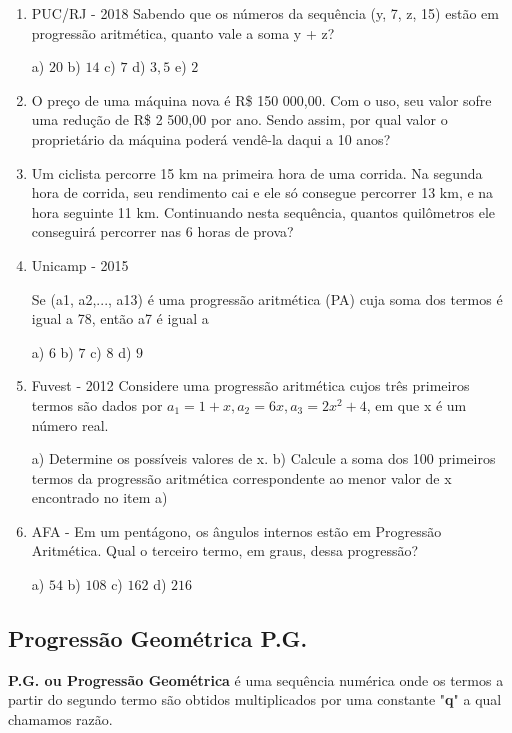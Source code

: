 \begin{multicols*}{2}
	\begin{enumerate}

		\item PUC/RJ - 2018 Sabendo que os números da sequência (y, 7, z, 15) estão em progressão aritmética, quanto vale a soma y + z?

		      a) $20 $ b) $14 $ c) $7 $ d) $3,5 $ e) $2 $

		\item O preço de uma máquina nova é R\$ 150 000,00. Com o uso, seu valor sofre uma redução de R\$ 2 500,00 por ano. Sendo assim, por qual valor o proprietário da máquina poderá vendê-la daqui a 10 anos?

		\item Um ciclista percorre 15 km na primeira hora de uma corrida. Na segunda hora de corrida, seu rendimento cai e ele só consegue percorrer 13 km, e na hora seguinte 11 km. Continuando nesta sequência, quantos quilômetros ele conseguirá percorrer nas 6 horas de prova?

		\item Unicamp - 2015

		      Se (a1, a2,..., a13) é uma progressão aritmética (PA) cuja soma dos termos é igual a 78, então a7 é igual a

		      a) $6 $ b) $7 $ c) $8 $ d) $9 $

		\item Fuvest - 2012 Considere uma progressão aritmética cujos três primeiros termos são dados por $ a_1 = 1 + x, a_2 = 6x, a_3 = 2x^2 + 4$, em que x é um número real.

		      a) Determine os possíveis valores de x.
		      b) Calcule a soma dos 100 primeiros termos da progressão aritmética correspondente ao menor valor de x encontrado no item a)

		\item AFA - Em um pentágono, os ângulos internos estão em Progressão Aritmética. Qual o terceiro termo, em graus, dessa progressão?

		      a) $54 $ b) $108 $ c) $162 $ d) $216 $

	\end{enumerate}

	\subsection*{Progressão Geométrica P.G.}

	\textbf{P.G. ou Progressão Geométrica} é uma sequência numérica onde os termos a partir do segundo termo são obtidos multiplicados por uma constante "\textbf{q}" a qual chamamos razão.


\end{multicols*}
